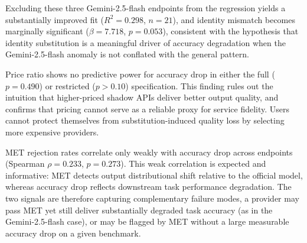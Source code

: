 \documentclass[letterpaper,twocolumn,10pt]{article}
\begin{document}
Excluding these three Gemini-2.5-flash endpoints from the regression yields a substantially improved fit ($R^2 = 0.298$, $n = 21$), and identity mismatch becomes marginally significant ($\beta = 7.718$, $p = 0.053$), consistent with the hypothesis that identity substitution is a meaningful driver of accuracy degradation when the Gemini-2.5-flash anomaly is not conflated with the general pattern.

Price ratio shows no predictive power for accuracy drop in either the full ($p = 0.490$) or restricted ($p > 0.10$) specification.
This finding rules out the intuition that higher-priced shadow APIs deliver better output quality, and confirms that pricing cannot serve as a reliable proxy for service fidelity.
Users cannot protect themselves from substitution-induced quality loss by selecting more expensive providers.

MET rejection rates correlate only weakly with accuracy drop across endpoints (Spearman $\rho = 0.233$, $p = 0.273$).
This weak correlation is expected and informative: MET detects output distributional shift relative to the official model, whereas accuracy drop reflects downstream task performance degradation.
The two signals are therefore capturing complementary failure modes, a provider may pass MET yet still deliver substantially degraded task accuracy (as in the Gemini-2.5-flash case), or may be flagged by MET without a large measurable accuracy drop on a given benchmark.

\end{document}
